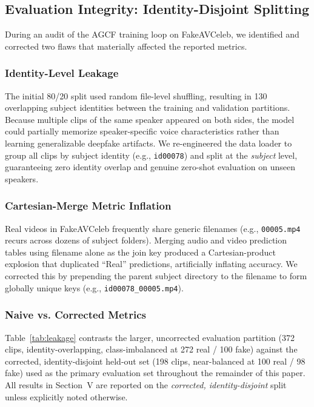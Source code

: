 \documentclass[conference]{IEEEtran}
\begin{document}
\subsection{Evaluation Integrity: Identity-Disjoint Splitting}
During an audit of the AGCF training loop on FakeAVCeleb, we identified and corrected two flaws that materially affected the reported metrics.

\subsubsection{Identity-Level Leakage}
The initial 80/20 split used random file-level shuffling, resulting in 130 overlapping subject identities between the training and validation partitions. Because multiple clips of the same speaker appeared on both sides, the model could partially memorize speaker-specific voice characteristics rather than learning generalizable deepfake artifacts. We re-engineered the data loader to group all clips by subject identity (e.g., \texttt{id00078}) and split at the \emph{subject} level, guaranteeing zero identity overlap and genuine zero-shot evaluation on unseen speakers.

\subsubsection{Cartesian-Merge Metric Inflation}
Real videos in FakeAVCeleb frequently share generic filenames (e.g., \texttt{00005.mp4} recurs across dozens of subject folders). Merging audio and video prediction tables using filename alone as the join key produced a Cartesian-product explosion that duplicated ``Real'' predictions, artificially inflating accuracy. We corrected this by prepending the parent subject directory to the filename to form globally unique keys (e.g., \texttt{id00078\_00005.mp4}).

\subsubsection{Naive vs. Corrected Metrics}
Table~\ref{tab:leakage} contrasts the larger, uncorrected evaluation partition (372 clips, identity-overlapping, class-imbalanced at 272 real / 100 fake) against the corrected, identity-disjoint held-out set (198 clips, near-balanced at 100 real / 98 fake) used as the primary evaluation set throughout the remainder of this paper. All results in Section~V are reported on the \emph{corrected, identity-disjoint} split unless explicitly noted otherwise.
\end{document}
